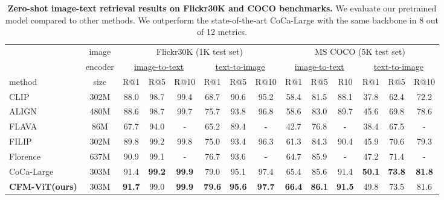 \documentclass[10pt,twocolumn,letterpaper]{article}
\newcommand{\white}[1]{\color[HTML]{FFFFFF}{{#1}}}
\newcommand{\tablestyle}[2]{\setlength{\tabcolsep}{#1}\renewcommand{\arraystretch}{#2}\centering\footnotesize}
\newcommand{\ours}{CFM-ViT\xspace}
\begin{document}
\begin{table*}[t]
\centering
\small
\tablestyle{6pt}{1.1}
\begin{tabular}{l|c|cccccc|cccccc}
&  image & 
\multicolumn{6}{c|}{Flickr30K (1K test set)} & \multicolumn{6}{c}{MS COCO (5K test set)} \\
& encoder & \multicolumn{3}{c}{\underline{{\white{-------}}image-to-text{\white{-------}}}} & \multicolumn{3}{c|}{\underline{{\white{-------}}text-to-image{\white{-------}}}} & \multicolumn{3}{c}{\underline{{\white{-------}}image-to-text{\white{-------}}}} & \multicolumn{3}{c}{\underline{{\white{-------}}text-to-image{\white{-------}}}} \\
method & size      & R@1  & R@5  & R@10 & R@1  & R@5   & R@10      & R@1  & R@5  & R10 & R@1  & R@5 & R@10    \\
\shline
CLIP~\cite{radford2021clip}   & 302M
      & 88.0 & 98.7 & 99.4 & 68.7 & 90.6 & 95.2        & 58.4 & 81.5 & 88.1 & 37.8 & 62.4 & 72.2 \\
ALIGN~\cite{align}   & 480M
      & 88.6 & 98.7 & 99.7 & 75.7 & 93.8 & 96.8        & 58.6 & 83.0 & 89.7 & 45.6 & 69.8 & 78.6 \\
FLAVA~\cite{singh2022flava}   & 86M
        & 67.7 & 94.0 & - & 65.2 & 89.4 & -             & 42.7 & 76.8 & - & 38.4 & 67.5 & -     \\
FILIP~\cite{yao2021filip}   & 302M
      & 89.8 & 99.2 & {99.8} & 75.0 & 93.4 & 96.3       & 61.3 & 84.3 & 90.4 & 45.9 & 70.6 & 79.3 \\
Florence~\cite{yuan2021florence} & 637M
         & 90.9 & 99.1 & - & 76.7 & 93.6 & -             & 64.7 & 85.9 & - & 47.2&  71.4&  -    \\
CoCa-Large~\cite{yu2022coca} & 303M
 & 91.4 & \bf{99.2} & \bf{99.9} & 79.0& 95.1 & 97.4      & 65.4 & 85.6 & {91.4}&  \bf{50.1} & \bf{73.8} & \bf{81.8}  \\
\hline
\bf{\ours (ours)}   & 303M & \bf{91.7}  & {99.0}  & \bf{99.9}   & \bf{79.6}  & \bf{95.6}  & \bf{97.7} 
& \bf{66.4}  & \bf{86.1}  & \bf{91.5}  & {49.8}  & {73.5}  & {81.6}
         \\ 
\end{tabular}
\caption{\textbf{Zero-shot image-text retrieval results on Flickr30K and COCO benchmarks.} We evaluate our pretrained model compared to other methods.
We outperform the state-of-the-art CoCa-Large with the same backbone in 8 out of 12 metrics.}
\label{tab:retrieval_sota}
\vspace{-2mm}
\end{table*}
\end{document}

